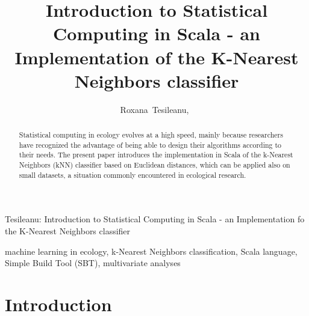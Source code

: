 \documentclass[journal]{IEEEtran}
\begin{document}
\title{Introduction to Statistical Computing in Scala - an Implementation of the K-Nearest Neighbors classifier}
\author{Roxana~Tesileanu,~}

{Tesileanu: Introduction to Statistical Computing in Scala - an Implementation fo the K-Nearest Neighbors classifier}

\maketitle

\begin{abstract}

Statistical computing in ecology evolves at a high speed, mainly because researchers have recognized the advantage of being able to design their algorithms according to their needs. The present paper introduces the implementation in Scala of the k-Nearest Neighbors (kNN) classifier based on Euclidean distances, which can be applied also on small datasets, a situation commonly encountered in ecological research. 

\end{abstract} 

\begin{IEEEkeywords}
machine learning in ecology, k-Nearest Neighbors classification, Scala language, Simple Build Tool (SBT), multivariate analyses 
\end{IEEEkeywords}

\section{Introduction}
\end{document}
